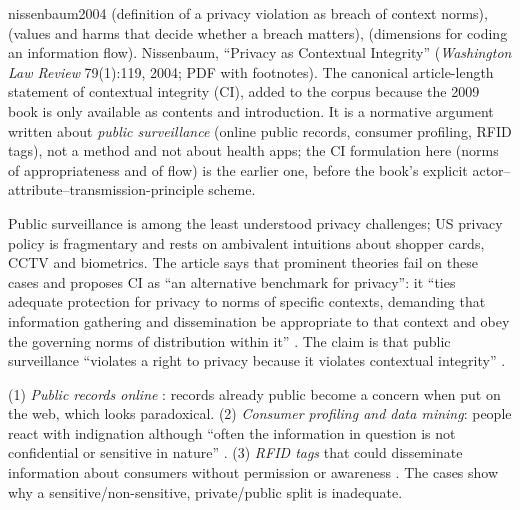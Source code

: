 \begin{papercard}{nissenbaum2004}
  (definition of a privacy violation as breach of context norms),  (values and harms that decide whether a breach matters),  (dimensions for coding an information flow). Nissenbaum, ``Privacy as Contextual Integrity'' (\emph{Washington Law Review} 79(1):119, 2004; PDF with footnotes). The canonical article-length statement of contextual integrity (CI), added to the corpus because the 2009 book is only available as contents and introduction. It is a normative argument written about \emph{public surveillance} (online public records, consumer profiling, RFID tags), not a method and not about health apps; the CI formulation here (norms of appropriateness and of flow) is the earlier one, before the book's explicit actor--attribute--transmission-principle scheme.

 Public surveillance is among the least understood privacy challenges; US privacy policy is fragmentary and rests on ambivalent intuitions about shopper cards, CCTV and biometrics. The article says that prominent theories fail on these cases and proposes CI as ``an alternative benchmark for privacy'': it ``ties adequate protection for privacy to norms of specific contexts, demanding that information gathering and dissemination be appropriate to that context and obey the governing norms of distribution within it'' . The claim is that public surveillance ``violates a right to privacy because it violates contextual integrity'' .

 (1) \emph{Public records online} : records already public become a concern when put on the web, which looks paradoxical. (2) \emph{Consumer profiling and data mining}: people react with indignation although ``often the information in question is not confidential or sensitive in nature'' . (3) \emph{RFID tags} that could disseminate information about consumers without permission or awareness . The cases show why a sensitive/non-sensitive, private/public split is inadequate.


\end{papercard}

